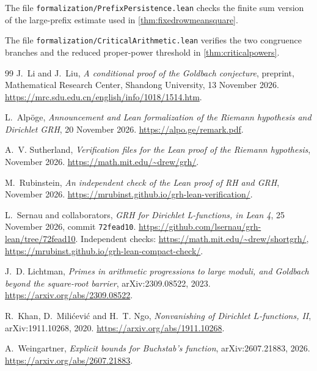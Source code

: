 \documentclass[11pt,a4paper]{article}
\numberwithin{equation}{section}
\begin{document}
The file \texttt{formalization/PrefixPersistence.lean} checks
the finite sum version of the large-prefix estimate used in
\cref{thm:fixedrowmeansquare}.

The file \texttt{formalization/CriticalArithmetic.lean}
verifies the two congruence branches and the reduced
proper-power threshold in \cref{thm:criticalpowers}.

\clearpage
{\small
\begin{thebibliography}{99}
J.~Li and J.~Liu,
\newblock \emph{A conditional proof of the Goldbach conjecture},
\newblock preprint, Mathematical Research Center, Shandong University,
13 November 2026.
\newblock \url{https://mrc.sdu.edu.cn/english/info/1018/1514.htm}.

L.~Alp\"oge,
\newblock \emph{Announcement and Lean formalization of the Riemann
hypothesis and Dirichlet GRH}, 20 November 2026.
\newblock \url{https://alpo.ge/remark.pdf}.

A.~V. Sutherland,
\newblock \emph{Verification files for the Lean proof of the Riemann
hypothesis}, November 2026.
\newblock \url{https://math.mit.edu/~drew/grh/}.

M.~Rubinstein,
\newblock \emph{An independent check of the Lean proof of RH and GRH},
November 2026.
\newblock \url{https://mrubinst.github.io/grh-lean-verification/}.

L.~Sernau and collaborators,
\newblock \emph{GRH for Dirichlet L-functions, in Lean 4},
25 November 2026, commit \texttt{72fead10}.
\newblock \url{https://github.com/lsernau/grh-lean/tree/72fead10}.
\newblock Independent checks:
\url{https://math.mit.edu/~drew/shortgrh/},
\url{https://mrubinst.github.io/grh-lean-compact-check/}.

J.~D. Lichtman,
\newblock \emph{Primes in arithmetic progressions to large moduli,
and Goldbach beyond the square-root barrier},
\newblock arXiv:2309.08522, 2023.
\newblock \url{https://arxiv.org/abs/2309.08522}.

R.~Khan, D.~Mili\'cevi\'c and H.~T. Ngo,
\newblock \emph{Nonvanishing of Dirichlet $L$-functions, II},
arXiv:1911.10268, 2020.
\newblock \url{https://arxiv.org/abs/1911.10268}.

A.~Weingartner,
\newblock \emph{Explicit bounds for Buchstab's function},
arXiv:2607.21883, 2026.
\newblock \url{https://arxiv.org/abs/2607.21883}.


\end{thebibliography}}
\end{document}
